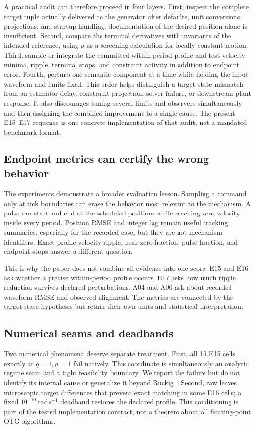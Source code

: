 A practical audit can therefore proceed in four layers. First, inspect the complete target tuple actually delivered to the generator after defaults, unit conversions, projections, and startup handling; documentation of the desired position alone is insufficient. Second, compare the terminal derivatives with invariants of the intended reference, using $\rho$ as a screening calculation for locally constant motion. Third, sample or integrate the committed within-period profile and test velocity minima, ripple, terminal stops, and constraint activity in addition to endpoint error. Fourth, perturb one semantic component at a time while holding the input waveform and limits fixed. This order helps distinguish a target-state mismatch from an estimator delay, constraint projection, solver failure, or downstream plant response. It also discourages tuning several limits and observers simultaneously and then assigning the combined improvement to a single cause. The present E15--E17 sequence is one concrete implementation of that audit, not a mandated benchmark format.

\subsection{Endpoint metrics can certify the wrong behavior}

The experiments demonstrate a broader evaluation lesson. Sampling a command only at tick boundaries can erase the behavior most relevant to the mechanism. A pulse can start and end at the scheduled positions while reaching zero velocity inside every period. Position RMSE and integer lag remain useful tracking summaries, especially for the recorded case, but they are not mechanism identifiers. Exact-profile velocity ripple, near-zero fraction, pulse fraction, and endpoint stops answer a different question.

This is why the paper does not combine all evidence into one score. E15 and E16 ask whether a precise within-period profile occurs. E17 asks how much ripple reduction survives declared perturbations. A04 and A06 ask about recorded waveform RMSE and observed alignment. The metrics are connected by the target-state hypothesis but retain their own units and statistical interpretation.

\subsection{Numerical seams and deadbands}

Two numerical phenomena deserve separate treatment. First, all 16 E15 cells exactly at $q=1,\rho=1$ fail natively. This coordinate is simultaneously an analytic regime seam and a tight feasibility boundary. We report the failure but do not identify its internal cause or generalize it beyond Ruckig~\RuckigVersion. Second, raw \FutureOOne{} leaves microscopic target differences that prevent exact matching in some E16 cells; a fixed $10^{-10}\ \mathrm{rad\,s^{-1}}$ deadband restores the declared profile. This conditioning is part of the tested implementation contract, not a theorem about all floating-point OTG algorithms.

